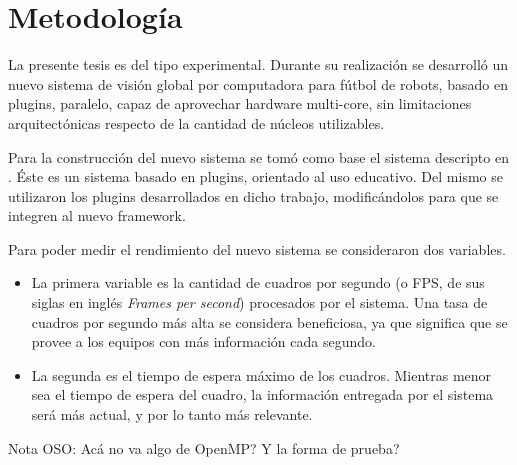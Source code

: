
\section{Metodología}

La presente tesis es del tipo experimental. Durante su realización se desarrolló
un nuevo sistema de visión global por computadora para fútbol de robots, basado
en plugins, paralelo, capaz de aprovechar hardware multi-core, sin limitaciones
arquitectónicas respecto de la cantidad de núcleos utilizables.

Para la construcción del nuevo sistema se tomó como base el sistema descripto en
\cite{torres2014}. Éste es un sistema basado en plugins, orientado al uso
educativo. Del mismo se utilizaron los plugins desarrollados en dicho trabajo,
modificándolos para que se integren al nuevo framework.

Para poder medir el rendimiento del nuevo sistema se consideraron dos variables.

\begin {itemize}

	\item	La primera variable es la cantidad de cuadros por segundo (o
		FPS, de sus siglas en inglés \emph{Frames per second})
		procesados por el sistema. Una tasa de cuadros por segundo más
		alta se considera beneficiosa, ya que significa que se provee a
		los equipos con más información cada segundo.

	\item	La segunda es el tiempo de espera máximo de los cuadros.
		Mientras menor sea el tiempo de espera del cuadro, la
		información entregada por el sistema será más actual, y por lo
		tanto más relevante.

\end {itemize}

Nota OSO: Acá no va algo de OpenMP? Y la forma de prueba?
